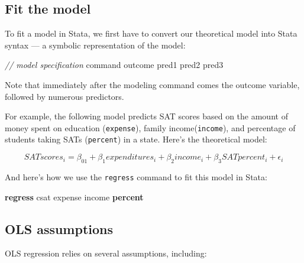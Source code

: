 \documentclass[
]{book}
\newenvironment{Shaded}{\begin{snugshade}}{\end{snugshade}}
\newcommand{\CommentTok}[1]{\textcolor[rgb]{0.56,0.35,0.01}{\textit{#1}}}
\newcommand{\KeywordTok}[1]{\textcolor[rgb]{0.13,0.29,0.53}{\textbf{#1}}}
\newcommand{\NormalTok}[1]{#1}
\begin{document}
\hypertarget{fit-the-model}{%
\subsection{Fit the model}\label{fit-the-model}}

To fit a model in Stata, we first have to convert our theoretical model into
Stata syntax --- a symbolic representation of the model:

\begin{Shaded}
\begin{Highlighting}[]
\CommentTok{// model specification}
\NormalTok{command outcome pred1 pred2 pred3}
\end{Highlighting}
\end{Shaded}

Note that immediately after the modeling command comes the outcome variable, followed by numerous predictors.

For example, the following model predicts SAT scores based on the amount of money spent on education (\texttt{expense}), family income(\texttt{income}), and percentage of students taking SATs (\texttt{percent}) in a state. Here's the theoretical model:

\begin{alert}

\[
SATscores_i = \beta_01 + \beta_1expenditures_i + \beta_2income_i +\beta_3SATpercent_i + \epsilon_i
\]

\end{alert}

And here's how we use the \texttt{regress} command to fit this model in Stata:

\begin{Shaded}
\begin{Highlighting}[]
\KeywordTok{regress}\NormalTok{ csat expense income }\KeywordTok{percent} 
\end{Highlighting}
\end{Shaded}

\hypertarget{ols-assumptions}{%
\subsection{OLS assumptions}\label{ols-assumptions}}

OLS regression relies on several assumptions, including:
\end{document}
